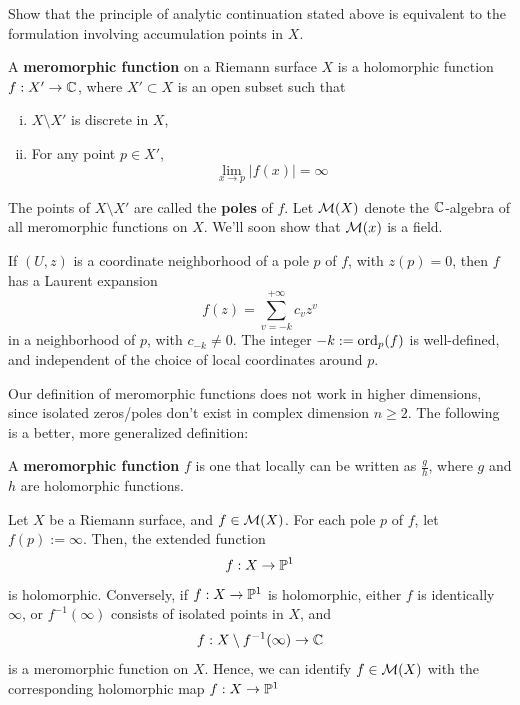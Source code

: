 \documentclass[11pt]{article}
\begin{document}
\begin{exercise}
    Show that the principle of analytic continuation stated above is equivalent to the formulation involving accumulation points in $X$.
\end{exercise}

\begin{defn}
    A \textbf{meromorphic function} on a Riemann surface $X$ is a holomorphic function $f:X'\to \C$, where $X'\subset X$ is an open subset such that
    \begin{enumerate}[(i)]
        \item $X \setminus X'$ is discrete in $X$,
        \item For any point $p \in X'$, 
        $$\lim_{x \to p}|f(x)| = \infty$$
    \end{enumerate}
    The points of $X\setminus X'$ are called the \textbf{poles} of $f$. Let $\mc M(X)$ denote the $\C$-algebra of all meromorphic functions on $X$. We'll soon show that $\mc M(x)$ is a field.
\end{defn}

\begin{rmk}
    If $(U,z)$ is a coordinate neighborhood of a pole $p$ of $f$, with $z(p)=0$, then $f$ has a Laurent expansion 
    $$f(z) = \sum_{v=-k}^{+\infty} c_vz^v$$
    in a neighborhood of $p$, with $c_{-k} \neq 0$. The integer $-k:=\ord_p(f)$ is well-defined, and independent of the choice of local coordinates around $p$.
\end{rmk}

Our definition of meromorphic functions does not work in higher dimensions, since isolated zeros/poles don't exist in complex dimension $n\geq 2$. The following is a better, more generalized definition:
\begin{defn}
    A \textbf{meromorphic function} $f$ is one that locally can be written as $\frac{g}{h}$, where $g$ and $h$ are holomorphic functions.
\end{defn}

\begin{thm}[][label=thm:mer_is_hol]
    Let $X$ be a Riemann surface, and $f \in \mc M(X)$. For each pole $p$ of $f$, let $f(p):= \infty$. Then, the extended function
    $$f:X \to \P^1$$
    is holomorphic. Conversely, if $f:X \to \P^1$ is holomorphic, either $f$ is identically $\infty$, or $f^{-1}(\infty)$ consists of isolated points in $X$, and
    $$f:X\setminus f^{-1}(\infty) \to \C$$
    is a meromorphic function on $X$. Hence, we can identify $f \in \mc M(X)$ with the corresponding holomorphic map $f:X \to \P^1$
\end{thm}
\end{document}
